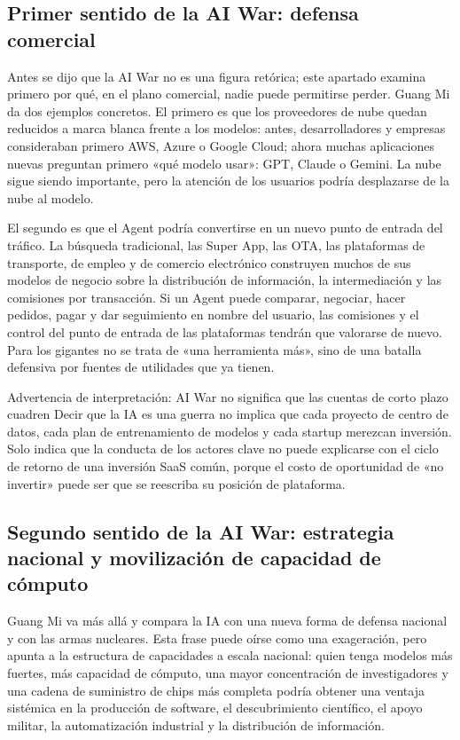 \documentclass[a4paper]{article}
\begin{document}
\subsection{Primer sentido de la AI War: defensa comercial}

Antes se dijo que la AI War no es una figura retórica; este apartado examina primero por qué, en el plano comercial, nadie puede permitirse perder. Guang Mi da dos ejemplos concretos. El primero es que los proveedores de nube quedan reducidos a marca blanca frente a los modelos: antes, desarrolladores y empresas consideraban primero AWS, Azure o Google Cloud; ahora muchas aplicaciones nuevas preguntan primero «qué modelo usar»: GPT, Claude o Gemini. La nube sigue siendo importante, pero la atención de los usuarios podría desplazarse de la nube al modelo.

El segundo es que el Agent podría convertirse en un nuevo punto de entrada del tráfico. La búsqueda tradicional, las Super App, las OTA, las plataformas de transporte, de empleo y de comercio electrónico construyen muchos de sus modelos de negocio sobre la distribución de información, la intermediación y las comisiones por transacción. Si un Agent puede comparar, negociar, hacer pedidos, pagar y dar seguimiento en nombre del usuario, las comisiones y el control del punto de entrada de las plataformas tendrán que valorarse de nuevo. Para los gigantes no se trata de «una herramienta más», sino de una batalla defensiva por fuentes de utilidades que ya tienen.

\begin{warningbox}{Advertencia de interpretación: AI War no significa que las cuentas de corto plazo cuadren}
Decir que la IA es una guerra no implica que cada proyecto de centro de datos, cada plan de entrenamiento de modelos y cada startup merezcan inversión. Solo indica que la conducta de los actores clave no puede explicarse con el ciclo de retorno de una inversión SaaS común, porque el costo de oportunidad de «no invertir» puede ser que se reescriba su posición de plataforma.
\end{warningbox}

\subsection{Segundo sentido de la AI War: estrategia nacional y movilización de capacidad de cómputo}

Guang Mi va más allá y compara la IA con una nueva forma de defensa nacional y con las armas nucleares. Esta frase puede oírse como una exageración, pero apunta a la estructura de capacidades a escala nacional: quien tenga modelos más fuertes, más capacidad de cómputo, una mayor concentración de investigadores y una cadena de suministro de chips más completa podría obtener una ventaja sistémica en la producción de software, el descubrimiento científico, el apoyo militar, la automatización industrial y la distribución de información.
\end{document}
